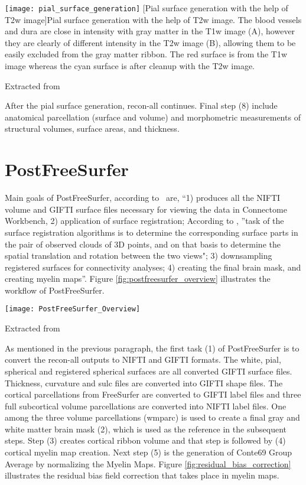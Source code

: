 \begin{center}
  \texttt{[image: pial\_surface\_generation]}
  [Pial surface generation with the help of T2w image]{Pial surface generation with the help of T2w image. The blood vessels and dura are close in intensity with gray matter in the T1w image (A), however they are clearly of different intensity in the T2w image (B), allowing them to be easily excluded from the gray matter ribbon. The red surface is from the T1w image whereas the cyan surface is after cleanup with the T2w image.}
  \label{fig:pial_surface_generation}
  \caption*{Extracted from \cite{Gla13}}
\end{center}

After the pial surface generation, recon-all continues. Final step (8) include anatomical parcellation (surface and volume) and morphometric measurements of structural volumes, surface areas, and thickness.

\section{PostFreeSurfer} \label{sec:PostFreeSurfer}
Main goals of PostFreeSurfer, according to~\cite{Gla13} are, ``1) produces all the NIFTI volume and GIFTI surface files necessary for viewing the data in Connectome Workbench, 2) application of surface registration; According to \cite{DBLP:journals/corr/HrgeticP13}, ''task of the surface registration algorithms is to determine the corresponding surface parts in the pair of observed clouds of 3D points, and on that basis to determine the spatial translation and rotation between the two views"; 3) downsampling registered surfaces for connectivity analyses; 4) creating the final brain mask, and creating myelin maps''. Figure \ref{fig:postfreesurfer_overview} illustrates the workflow of PostFreeSurfer.\\

\begin{center}
  \texttt{[image: PostFreeSurfer\_Overview]}
  \label{fig:postfreesurfer_overview}
  \caption*{Extracted from \cite{Gla13}}
\end{center}

As mentioned in the previous paragraph, the first task (1) of PostFreeSurfer is to convert the recon-all outputs to NIFTI and GIFTI formats. The white, pial, spherical and registered spherical surfaces are all converted GIFTI surface files. Thickness, curvature and sulc files are converted into GIFTI shape files. The cortical parcellations from FreeSurfer are converted to GIFTI label files and three full subcortical volume parcellations are converted into NIFTI label files. One among the three volume parcellations (wmparc) is used to create a final gray and white matter brain mask (2), which is used as the reference in the subsequent steps. Step (3) creates cortical ribbon volume and that step is followed by (4) cortical myelin map creation. Next step (5) is the generation of Conte69 Group Average by normalizing the Myelin Maps. Figure \ref{fig:residual_bias_correction} illustrates the residual bias field correction that takes place in myelin maps.

